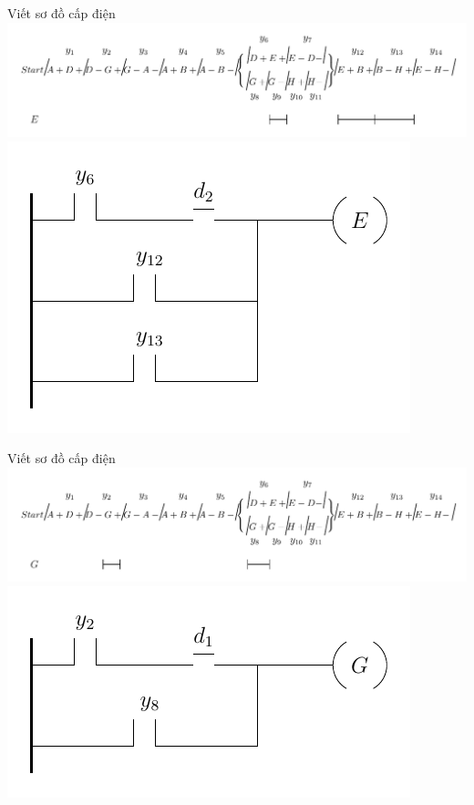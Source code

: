 \documentclass[24pt]{beamer}
\begin{document}
\begin{frame}[plain]{Viết sơ đồ cấp điện}
		\vspace{-0.5cm}
		\hspace{-1cm}\includegraphics[scale=0.7]{draw-tikz/quatrinh-bt4-buoc3-sodocapdien-E-b1.pdf}\\
		\vspace{-1cm}
		\includegraphics[scale=1.2]{draw-tikz/quatrinh-bt4-buoc3-sodocapdien-E-b2.pdf}
\end{frame}

\begin{frame}[plain]{Viết sơ đồ cấp điện}
		\vspace{-0.5cm}
		\hspace{-1cm}\includegraphics[scale=0.7]{draw-tikz/quatrinh-bt4-buoc3-sodocapdien-G-b1.pdf}\\
		\vspace{-.5cm}
		\includegraphics[scale=1.5]{draw-tikz/quatrinh-bt4-buoc3-sodocapdien-G-b2.pdf}
\end{frame}
\end{document}
